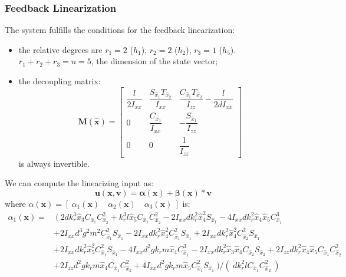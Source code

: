 \documentclass[11pt,a4paper]{scrartcl}
\begin{document}
\subsubsection{Feedback Linearization}

The system fulfills the conditions for the feedback linearization:
\begin{itemize}
	\item the relative degrees are $ r_1 = 2 $ ($ h_1 $), $ r_2 = 2 $ ($ h_2 $), $ r_3 = 1 $ ($ h_5 $). $ r_1 + r_2 + r_3 = n = 5 $, the dimension of the state vector;
 
	\item the decoupling matrix:
	\begin{equation}
	\mathbf{M(\hat{x})} = 
	\begin{bmatrix}
	\dfrac{l}{2I_{xx}} & \dfrac{S_{\hat{x}_1} T_{\hat{x}_2}}{I_{xx}} & \dfrac{C_{\hat{x}_1}T_{\hat{x}_2}}{I_{zz}} -\dfrac{l}{2dI_{xx}} \\
	0 & \dfrac{C_{\hat{x}_1}}{I_{xx}} & -\dfrac{S_{\hat{x}_1}}{I_{zz}} \\
	0 & 0 & \dfrac{1}{I_{zz}} 
	\end{bmatrix}
	\end{equation}
	is always invertible.
\end{itemize}

We can compute the linearizing input as:
\begin{equation}
	\mathbf{u(x,v) = \alpha(x)+\beta(x)*v}
	\label{LinearizingControlLaw}
\end{equation}
where $ \alpha(\mathbf{x}) = [ \ \alpha_1(\mathbf{x}) \quad \alpha_2(\mathbf{x}) \quad \alpha_3(\mathbf{x}) \ ] $ is:
\begin{equation}
	\begin{split}
	\alpha_1(\mathbf{x}) = & \
	( \ 2 d k_r^3 \hat{x}_3  C_{\hat{x}_1}  C_{\hat{x}_2}^2 + k_r^3 l \hat{x}_5  C_{\hat{x}_1}  C_{\hat{x}_2}^2 - 2 I_{xx} d k_r^2 \hat{x}_4^2 S_{\hat{x}_1} 
	- 4 I_{xx} d k_r^2 \hat{x}_4 \hat{x}_5  C_{\hat{x}_1}^3 \\
	&+ 2 I_{xx} d^3 g^2 m^2  C_{\hat{x}_1}^2 S_{\hat{x}_1} - 2 I_{xx} d k_r^2 \hat{x}_4^2  C_{\hat{x}_1}^2 S_{\hat{x}_1} + 2 I_{xx} d k_r^2 \hat{x}_4^2  C_{\hat{x}_2}^2 S_{\hat{x}_1} \\
	& + 2 I_{xx} d k_r^2 \hat{x}_5^2  C_{\hat{x}_1}^2 S_{\hat{x}_1} - 4 I_{xx} d^2 g k_r m \hat{x}_4  C_{\hat{x}_1}^3 - 2 I_{xx} d k_r^2 \hat{x}_3 \hat{x}_4  C_{\hat{x}_2} S_{\hat{x}_2} + 2 I_{zz} d k_r^2 \hat{x}_4 \hat{x}_5  C_{\hat{x}_1}  C_{\hat{x}_2}^2 \\
	& + 2 I_{zz} d^2 g k_r m \hat{x}_4  C_{\hat{x}_1}  C_{\hat{x}_2}^2 + 4 I_{xx} d^2 g k_r m \hat{x}_5  C_{\hat{x}_1}^2 S_{\hat{x}_1} \ )/( \ d k_r^2 l  C_{\hat{x}_1}  C_{\hat{x}_2}^2 \ )
	\end{split}
\end{equation}
\end{document}
